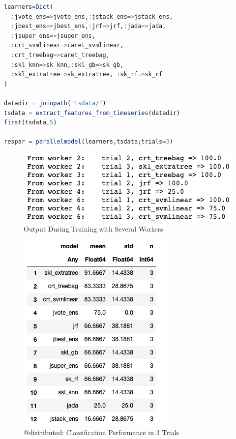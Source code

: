 \documentclass{juliacon}
\begin{document}
\begin{lstlisting}[language = Julia]
learners=Dict(
  :jvote_ens=>jvote_ens,:jstack_ens=>jstack_ens,
  :jbest_ens=>jbest_ens,:jrf=>jrf,:jada=>jada,
  :jsuper_ens=>jsuper_ens, 
  :crt_svmlinear=>caret_svmlinear,
  :crt_treebag=>caret_treebag,
  :skl_knn=>sk_knn,:skl_gb=>sk_gb,
  :skl_extratree=>sk_extratree, :sk_rf=>sk_rf
)

datadir = joinpath("tsdata/")
tsdata = extract_features_from_timeseries(datadir)
first(tsdata,5)

respar = parallelmodel(learners,tsdata;trials=3)
\end{lstlisting}

\begin{figure}[htbp]
   \centering
   \includegraphics[width=0.8\columnwidth]{sim.png} %
   \caption{Output During Training with Several Workers}
   \label{fig:sim}
\end{figure}

\begin{figure}[htbp]
   \centering
   \includegraphics[width=0.6\columnwidth]{results.png} %
   \caption{@distributed: Classification Performance in 3 Trials}
   \label{fig:performance}
\end{figure}
\end{document}
